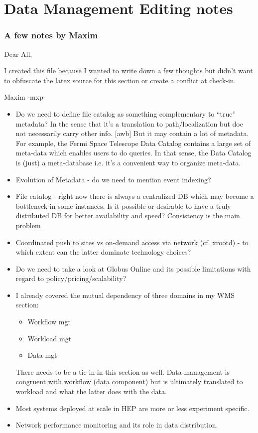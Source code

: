 \section{Data Management Editing notes}

\subsubsection{A few notes by Maxim}

Dear All,

I created this file because I wanted to write down a few thoughts but didn't want to obfuscate
the latex source for this section or create a conflict at check-in.

Maxim -mxp-

\begin{itemize}

\item Do we need to define file catalog as something complementary to ``true'' metadata? In the sense that it's a translation to path/localization but doe not necessarily carry other info. [awb] But it may contain a lot of metadata. For example, the Fermi Space Telescope Data Catalog contains a large set of meta-data which enables users to do queries. In that sense, the Data Catalog is (just) a meta-database i.e. it's a convenient way to organize meta-data.

\item Evolution of Metadata - do we need to mention event indexing?

\item File catalog - right now there is always a centralized DB which may become a bottleneck in some instances.
Is it possible or desirable to have a truly distributed DB for better availability and speed? Consistency is the main problem

\item Coordinated push to sites vs on-demand access via network (cf. xrootd) - to which extent can the latter dominate technology choices?

\item Do we need to take a look at Globus Online and its possible limitations with regard to policy/pricing/scalability?

\item I already covered the mutual dependency of three domains in my WMS section:
\begin{itemize}
\item Workflow mgt
\item Workload mgt
\item Data mgt
 \end{itemize}
 There needs to be a tie-in in this section as well. Data management is congruent with workflow (data component) but is ultimately
 translated to workload and what the latter does with the data.
 
 \item Most systems deployed at scale in HEP are more or less experiment specific.
 
 \item Network performance monitoring and its role in data distribution.
 
 \end{itemize}

